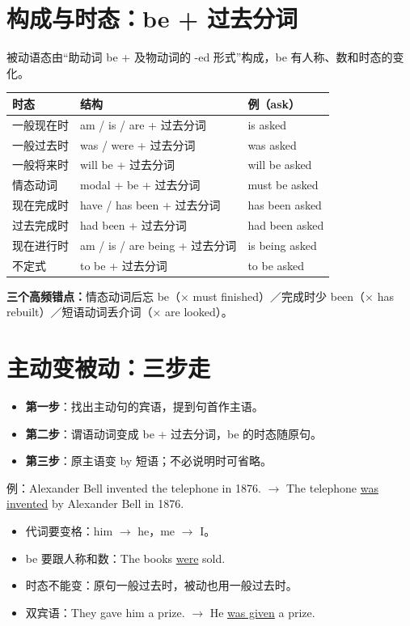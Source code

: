 \documentclass[11pt,a4paper]{ctexart}
\begin{document}
\section{构成与时态：be + 过去分词}
被动语态由“助动词 be + 及物动词的 -ed 形式”构成，be 有人称、数和时态的变化。
\begin{center}
\begin{tabular}{p{2.6cm}p{5.6cm}p{3.4cm}}
\hline
\textbf{时态} & \textbf{结构} & \textbf{例（ask）}\\
\hline
一般现在时 & am / is / are + 过去分词 & is asked\\
一般过去时 & was / were + 过去分词 & was asked\\
一般将来时 & will be + 过去分词 & will be asked\\
情态动词 & modal + be + 过去分词 & must be asked\\
现在完成时 & have / has been + 过去分词 & has been asked\\
过去完成时 & had been + 过去分词 & had been asked\\
现在进行时 & am / is / are being + 过去分词 & is being asked\\
不定式 & to be + 过去分词 & to be asked\\
\hline
\end{tabular}
\end{center}
\textbf{三个高频错点：}情态动词后忘 be（× must finished）／完成时少 been（× has rebuilt）／短语动词丢介词（× are looked）。

\section{主动变被动：三步走}
\begin{itemize}[leftmargin=1.4em]
\item \textbf{第一步}：找出主动句的宾语，提到句首作主语。
\item \textbf{第二步}：谓语动词变成 be + 过去分词，be 的时态随原句。
\item \textbf{第三步}：原主语变 by 短语；不必说明时可省略。
\end{itemize}
例：Alexander Bell invented the telephone in 1876.
$\rightarrow$ The telephone \underline{was invented} by Alexander Bell in 1876.
\begin{itemize}[leftmargin=1.4em]
\item 代词要变格：him $\rightarrow$ he，me $\rightarrow$ I。
\item be 要跟人称和数：The books \underline{were} sold.
\item 时态不能变：原句一般过去时，被动也用一般过去时。
\item 双宾语：They gave him a prize. $\rightarrow$ He \underline{was given} a prize.
\end{itemize}
\end{document}
